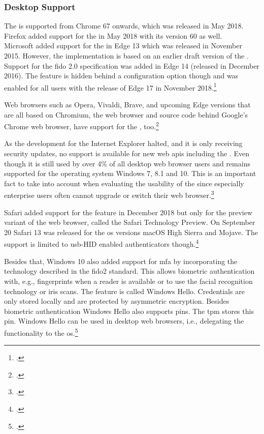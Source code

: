 \subsubsection{Desktop Support}

The \wa{} is supported from Chrome 67 onwards, which was released in May 2018. Firefox added support for the \wa{} in May 2018 with its version 60 as well.\\
Microsoft added support for the \wa{} in Edge 13 which was released in November 2015. However, the implementation is based on an earlier draft version of the \wa. Support for the \gls{fido} 2.0 specification was added in Edge 14 (released in December 2016). The feature is hidden behind a configuration option though and was enabled for all users with the release of Edge 17 in November 2018.\footcite[See][112]{Jacobs:2019}

Web browsers such as Opera, Vivaldi, Brave, and upcoming Edge versions that are all based on Chromium, the web browser and source code behind Google's Chrome web browser, have support for the \wa, too.\footcites[See][Chapter 7.1]{kissell2019take}

As the development for the Internet Explorer halted, and it is only receiving security updates, no support is available for new web \glspl{api} including the \wa. Even though it is still used by over 4\% of all desktop web browser users and remains supported for the operating system Windows 7, 8.1 and 10. This is an important fact to take into account when evaluating the usability of the \wa{} since especially enterprise users often cannot upgrade or switch their web browser.\footcites[See][]{ie-support}[See][]{statcounter-desktop}

Safari added support for the \wa{} feature in December 2018 but only for the preview variant of the web browser, called the Safari Technology Preview. On September 20 Safari 13 was released for the \gls{os} versions macOS High Sierra and Mojave. The support is limited to \gls{usb}-HID enabled authenticators though.\footcites[See][]{safari-webauthn}[See][]{safari-13-release}

Besides that, Windows 10 also added support for \gls{mfa} by incorporating the technology described in the \gls{fido}2 standard. This allows biometric authentication with, e.g., fingerprints when a reader is available or to use the facial recognition technology or iris scans. The feature is called \frqq Windows Hello\flqq{}. Credentials are only stored locally and are protected by asymmetric encryption. Besides biometric authentication Windows Hello also supports \glspl{pin}. The \gls{tpm} stores this \gls{pin}. Windows Hello can be used in desktop web browsers, i.e., delegating the \wa{} functionality to the \gls{os}.\footcites[See][]{201612}[See][6]{fido-whitepaper-amd}

